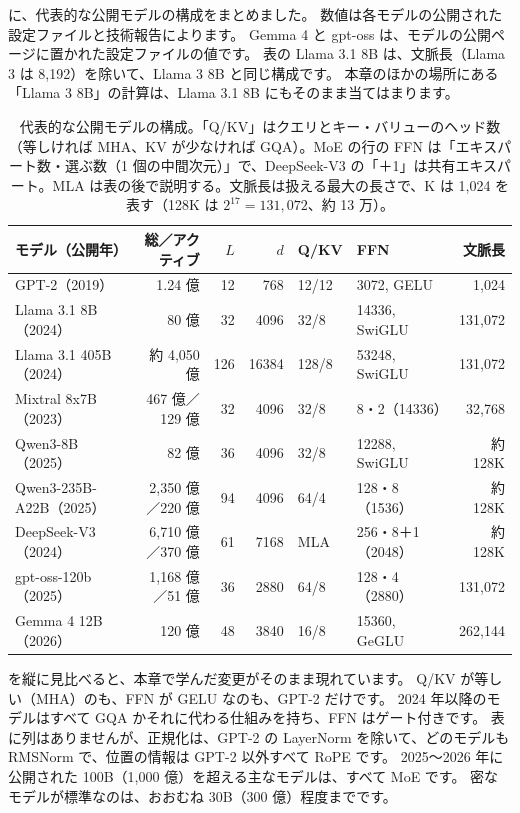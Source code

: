 に、代表的な公開モデルの構成をまとめました。
数値は各モデルの公開された設定ファイルと技術報告によります\cite{radford2019language,dubey2024llama3,jiang2024mixtral,yang2025qwen3,liu2024deepseekv3}。
Gemma 4 と gpt-oss は、モデルの公開ページに置かれた設定ファイルの値です。
表の Llama 3.1 8B は、文脈長（Llama 3 は 8,192）を除いて、Llama 3 8B と同じ構成です。
本章のほかの場所にある「Llama 3 8B」の計算は、Llama 3.1 8B にもそのまま当てはまります。

\begin{table}[tbp]
\centering
\caption{代表的な公開モデルの構成。「Q/KV」はクエリとキー・バリューのヘッド数（等しければ MHA、KV が少なければ GQA）。MoE の行の FFN は「エキスパート数・選ぶ数（1 個の中間次元）」で、DeepSeek-V3 の「＋1」は共有エキスパート。MLA は表の後で説明する。文脈長は扱える最大の長さで、K は 1,024 を表す（128K は $2^{17}=131{,}072$、約 13 万）。}
\label{tab:ma-models}
\footnotesize
\setlength{\tabcolsep}{3.6pt}
\begin{tabular}{@{}lrrrllr@{}}
\toprule
モデル（公開年） & 総／アクティブ & $L$ & $d$ & Q/KV & FFN & 文脈長 \\
\midrule
GPT-2（2019） & 1.24 億 & 12 & 768 & 12/12 & 3072, GELU & 1,024 \\
Llama 3.1 8B（2024） & 80 億 & 32 & 4096 & 32/8 & 14336, SwiGLU & 131,072 \\
Llama 3.1 405B（2024） & 約 4,050 億 & 126 & 16384 & 128/8 & 53248, SwiGLU & 131,072 \\
Mixtral 8x7B（2023） & 467 億／129 億 & 32 & 4096 & 32/8 & 8・2（14336） & 32,768 \\
Qwen3-8B（2025） & 82 億 & 36 & 4096 & 32/8 & 12288, SwiGLU & 約 128K \\
Qwen3-235B-A22B（2025） & 2,350 億／220 億 & 94 & 4096 & 64/4 & 128・8（1536） & 約 128K \\
DeepSeek-V3（2024） & 6,710 億／370 億 & 61 & 7168 & MLA & 256・8＋1（2048） & 約 128K \\
gpt-oss-120b（2025） & 1,168 億／51 億 & 36 & 2880 & 64/8 & 128・4（2880） & 131,072 \\
Gemma 4 12B（2026） & 120 億 & 48 & 3840 & 16/8 & 15360, GeGLU & 262,144 \\
\bottomrule
\end{tabular}
\end{table}

を縦に見比べると、本章で学んだ変更がそのまま現れています。
Q/KV が等しい（MHA）のも、FFN が GELU なのも、GPT-2 だけです。
2024 年以降のモデルはすべて GQA かそれに代わる仕組みを持ち、FFN はゲート付きです。
表に列はありませんが、正規化は、GPT-2 の LayerNorm を除いて、どのモデルも RMSNorm で、位置の情報は GPT-2 以外すべて RoPE です。
2025〜2026 年に公開された 100B（1,000 億）を超える主なモデルは、すべて MoE です。
密なモデルが標準なのは、おおむね 30B（300 億）程度までです。

